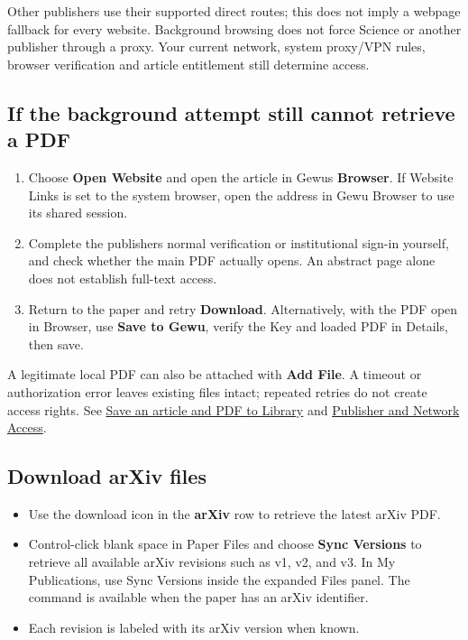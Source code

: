 \documentclass[10pt,letterpaper,oneside]{scrreprt}
\providecommand{\tightlist}{\setlength{\itemsep}{1pt}\setlength{\parskip}{0pt}}
\begin{document}
Other publishers use their supported direct routes; this does not imply a webpage fallback for every website. Background browsing does not force Science or another publisher through a proxy. Your current network, system proxy/VPN rules, browser verification and article entitlement still determine access.

\subsection{If the background attempt still cannot retrieve a PDF}\label{if-the-background-attempt-still-cannot-retrieve-a-pdf}

\begin{enumerate}
\tightlist
\item
  Choose \textbf{Open Website} and open the article in Gewu\textquotesingle s \textbf{Browser}. If Website Links is set to the system browser, open the address in Gewu Browser to use its shared session.
\item
  Complete the publisher\textquotesingle s normal verification or institutional sign-in yourself, and check whether the main PDF actually opens. An abstract page alone does not establish full-text access.
\item
  Return to the paper and retry \textbf{Download}. Alternatively, with the PDF open in Browser, use \textbf{Save to Gewu}, verify the Key and loaded PDF in Details, then save.
\end{enumerate}

A legitimate local PDF can also be attached with \textbf{Add File}. A timeout or authorization error leaves existing files intact; repeated retries do not create access rights. See \hyperref[browser-save-gewu]{Save an article and PDF to Library} and \hyperref[network-access]{Publisher and Network Access}.

\subsection{Download arXiv files}\label{download-arxiv-files}

\begin{itemize}
\tightlist
\item
  Use the download icon in the \textbf{arXiv} row to retrieve the latest arXiv PDF.
\item
  Control-click blank space in Paper Files and choose \textbf{Sync Versions} to retrieve all available arXiv revisions such as v1, v2, and v3. In My Publications, use Sync Versions inside the expanded Files panel. The command is available when the paper has an arXiv identifier.
\item
  Each revision is labeled with its arXiv version when known.
\end{itemize}
\end{document}
